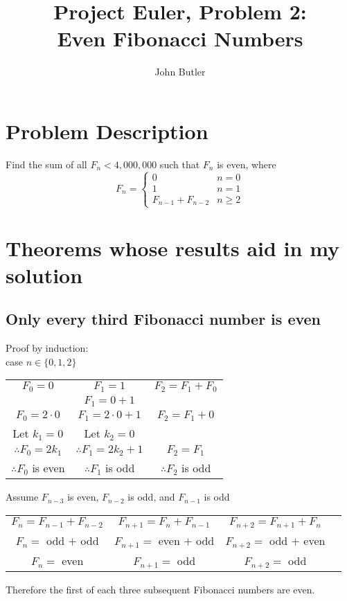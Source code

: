 \documentclass[11pt, oneside]{article}   	%
\title{Project Euler, Problem 2:\\\large{Even Fibonacci Numbers}}
\author{John Butler}
\date{}							%
\begin{document}
\maketitle

\tableofcontents
\newpage

\section{Problem Description}
	Find the sum of all $F_n < 4,000,000$ such that $F_n$ is even, where
	\[ F_n  = \begin{cases}
		0 & n = 0 \\
		1 & n = 1 \\
		F_{n-1} + F_{n-2} & n \ge 2
	\end{cases}	\]

\section{Theorems whose results aid in my solution}
	\subsection{Only every third Fibonacci number is even}
		Proof by induction:\\
		case $n \in \{0, 1, 2\}$
		\begin{center}
		\begin{tabular}{c|c|c}
			$F_0 = 0$&$F_1 = 1$&$F_2 = F_1 + F_0$\\
			&$F_1 = 0 + 1$&\\
			$F_0 = 2\cdot 0$&$F_1 = 2\cdot0 + 1$&$F_2 =  F_1 + 0$\\
			Let $k_1 = 0$&Let $k_2 = 0$&\\
			$\therefore F_0 = 2k_1$&$\therefore F_1 = 2k_2 + 1$&$F_2 = F_1$\\
			$\therefore F_0$ is even&$\therefore F_1$ is odd&$\therefore F_2$ is odd\\
		\end{tabular}
		\end{center}
		Assume $F_{n - 3}$ is even, $F_{n - 2}$ is odd, and $F_{n - 1}$ is odd
		\begin{center}
		\begin{tabular}{c|c|c c}
			$F_n = F_{n - 1} + F_{n - 2}$&$F_{n+1} = F_n + F_{n - 1}$&$F_{n+2} = F_{n + 1} + F_n$\\
			$F_n =$ odd $+ $ odd&$F_{n+1} =$ even $+$ odd&$F_{n+ 2} =$ odd $+$ even\\
			$F_n =$ even&$F_{n+1} =$ odd& $F_{n+2} =$ odd
		\end{tabular}
		\end{center}
		Therefore the first of each three subsequent Fibonacci numbers are even.
\end{document}
